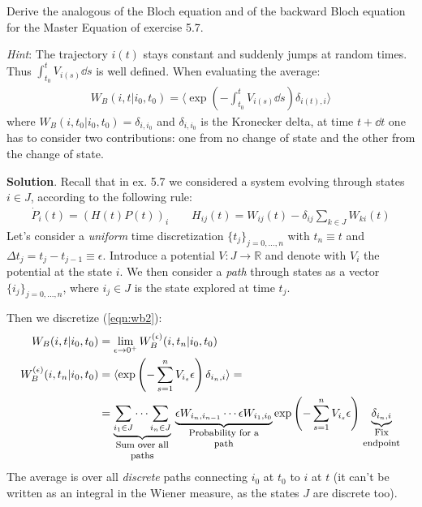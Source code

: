 \documentclass[../template.tex]{subfiles}
\begin{document}
\begin{exo} Derive the analogous of the Bloch equation and of the backward Bloch equation for the Master Equation of exercise 5.7.

    \textit{Hint}: The trajectory $i(t)$ stays constant and suddenly jumps 
    at random times. Thus $\int_{t_0}^t V_{i(s)} \dd{s}$ is well defined. When evaluating the average:
    \begin{align} \label{eqn:wb2}
        W_B(i,t|i_0,t_0) = \langle \exp\left(-\int_{t_0}^t V_{i(s)} \dd{s} \right) \delta_{i(t),i}\rangle
    \end{align}
    where $W_B(i,t_0|i_0,t_0) = \delta_{i,i_0}$ and $\delta_{i,i_0}$ is the Kronecker delta, at time $t+\dd{t}$ one has to consider two contributions: one from no change of state and the other from the change of state.

    \medskip

    \textbf{Solution}. Recall that in ex. 5.7 we considered a system evolving through states $i \in J$, according to the following rule:
    \begin{align*}
        \dot{P}_i(t) = (H(t)P(t))_i \qquad H_{ij}(t) = W_{ij}(t) - \delta_{ij} \sum_{k \in J} W_{ki}(t)
    \end{align*}
    Let's consider a \textit{uniform} time discretization $\{t_j\}_{j=0,\dots,n}$ with $t_n \equiv t$ and $\Delta t_j = t_{j}-t_{j-1} \equiv \epsilon$. Introduce a potential $V \colon J \to \mathbb{R}$ and denote with $V_i$ the potential at the state $i$. We then consider a \textit{path} through states as a vector $\{i_j\}_{j=0,\dots,n}$, where $i_j \in J$ is the state explored at time $t_j$.


    Then we discretize (\ref{eqn:wb2}):
    \begin{align} \nonumber
        W_B(i,t|i_0,t_0) &= \lim_{\epsilon \to 0^+} W_B^{(\epsilon)}(i,t_n|i_0,t_0)\\ \nonumber
        W_B^{(\epsilon)}(i,t_n|i_0,t_0) &= \langle \exp\left(-\sum_{s=1}^n V_{i_s} \epsilon\right) \delta_{i_n,i}\rangle =\\
        &= \underbrace{\sum_{i_1 \in J} \cdots \sum_{i_n \in J}}_{\parbox{5em}{\centering \footnotesize Sum over all paths}} \> \underbrace{\epsilon W_{i_n,i_{n-1}} \cdots \epsilon W_{i_1,i_0}}_{\parbox{7em}{\footnotesize \centering Probability for a path}} \exp\left(-\sum_{s=1}^n V_{i_s} \epsilon\right) \underbrace{\delta_{i_n,i}}_{\parbox{3.5em}{\footnotesize\centering Fix endpoint}} \label{eqn:wb-discrete}
    \end{align}
    The average is over all \textit{discrete} paths connecting $i_0$ at $t_0$ to $i$ at $t$ (it can't be written as an integral in the Wiener measure, as the states $J$ are discrete too). 


\end{exo}
\end{document}
